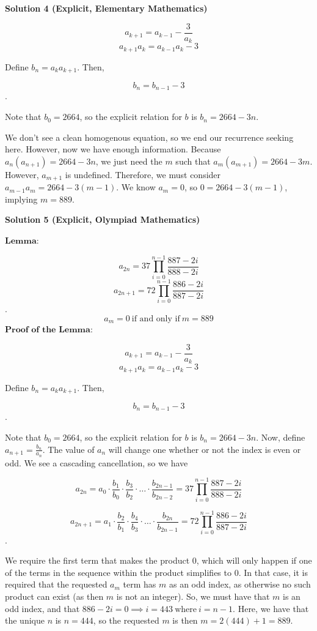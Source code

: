 \begin{enumerate}
 



\textbf{Solution 4 (Explicit, Elementary Mathematics)}


 \[a_{k+1} = a_{k-1} - \frac{3}{a_k}\]
 \[a_{k+1}a_{k} = a_{k-1}a_{k} - 3\]

 Define $b_n = a_{k}a_{k+1}$. Then,

 
 \[b_n = b_{n-1} - 3\].

 Note that $b_0 = 2664$, so the explicit relation for $b$ is $b_n = 2664-3n$. 

 We don't see a clean homogenous equation, so we end our recurrence seeking here. However, now we have enough information. Because $a_n(a_{n+1}) = 2664-3n$, we just need the $m$ such that $a_m(a_{m+1}) = 2664-3m$. However, $a_{m+1}$ is undefined. Therefore, we must consider $a_{m-1}a_{m} = 2664-3(m-1)$. We know $a_m = 0$, so $0 = 2664-3(m-1)$, implying $m = \boxed{889}$.

 



\textbf{Solution 5 (Explicit, Olympiad Mathematics)}

$\textbf{Lemma}:$

 \[a_{2n} = 37 \prod_{i=0}^{n-1} \frac{887-2i}{888 - 2i}\]
 \[a_{2n+1} = 72 \prod_{i=0}^{n-1} \frac{886-2i}{887-2i}\].
 \[a_m = 0 \ \text{if and only if} \ m = \boxed{889}\]
$\textbf{Proof of the Lemma}:$

 \[a_{k+1} = a_{k-1} - \frac{3}{a_k}\]
 \[a_{k+1}a_{k} = a_{k-1}a_{k} - 3\]

 Define $b_n = a_{k}a_{k+1}$. Then,

 
 \[b_n = b_{n-1} - 3\].

 Note that $b_0 = 2664$, so the explicit relation for $b$ is $b_n = 2664-3n$. Now, define $a_{n+1} = \frac{b_n}{a_n}$. The value of $a_n$ will change one whether or not the index is even or odd. We see a cascading cancellation, so we have

 
 \[a_{2n} = a_0 \cdot \frac{b_1}{b_0} \cdot \frac{b_3}{b_2} \cdot \dots \cdot \frac{b_{2n-1}}{b_{2n-2}} = 37 \prod_{i=0}^{n-1} \frac{887-2i}{888 - 2i}\]

 \[a_{2n+1} = a_1 \cdot \frac{b_2}{b_1} \cdot \frac{b_4}{b_3} \cdot \dots \cdot \frac{b_{2n}}{b_{2n-1}} = 72 \prod_{i=0}^{n-1} \frac{886-2i}{887-2i}\].

 We require the first term that makes the product 0, which will only happen if one of the terms in the sequence within the product simplifies to 0. In that case, it is required that the requested $a_m$ term has $m$ as an odd index, as otherwise no such product can exist (as then $m$ is not an integer). So, we must have that $m$ is an odd index, and that $886-2i = 0 \implies i = 443 \ \text{where} \ i = n-1$. Here, we have that the unique $n$ is $n = 444$, so the requested $m$ is then $m = 2(444) + 1 = \boxed{889}$.


\end{enumerate}
